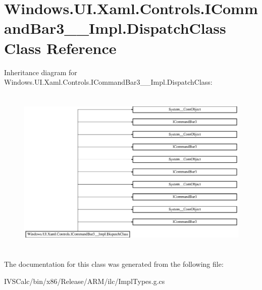\hypertarget{class_windows_1_1_u_i_1_1_xaml_1_1_controls_1_1_i_command_bar3_____impl_1_1_dispatch_class}{}\section{Windows.\+U\+I.\+Xaml.\+Controls.\+I\+Command\+Bar3\+\_\+\+\_\+\+Impl.\+Dispatch\+Class Class Reference}
\label{class_windows_1_1_u_i_1_1_xaml_1_1_controls_1_1_i_command_bar3_____impl_1_1_dispatch_class}
Inheritance diagram for Windows.\+U\+I.\+Xaml.\+Controls.\+I\+Command\+Bar3\+\_\+\+\_\+\+Impl.\+Dispatch\+Class\+:\begin{figure}[H]
\begin{center}
\leavevmode
\includegraphics[height=8.169762cm]{class_windows_1_1_u_i_1_1_xaml_1_1_controls_1_1_i_command_bar3_____impl_1_1_dispatch_class}
\end{center}
\end{figure}


The documentation for this class was generated from the following file\+:\begin{DoxyCompactItemize}
\item 
I\+V\+S\+Calc/bin/x86/\+Release/\+A\+R\+M/ilc/Impl\+Types.\+g.\+cs\end{DoxyCompactItemize}
